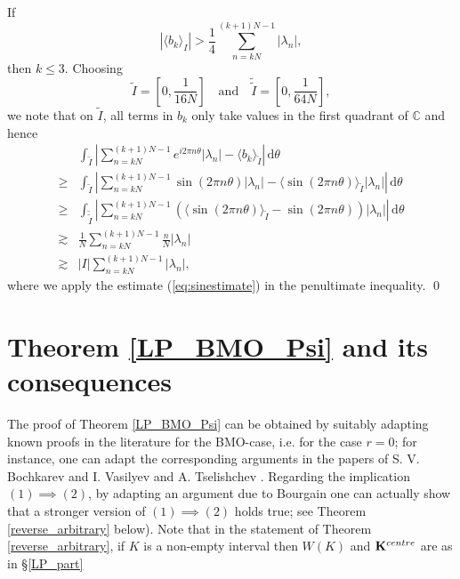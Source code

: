 \documentclass[a4paper, leqno, 10pt]{amsart}
\numberwithin{equation}{section}
\newcommand{\dd}{\mathrm{d}}
\newcommand{\C}{\mathbb{C}}
\newcommand{\dbtilde}[1]{\tilde{\tilde{#1}}}
\begin{document}
If \[
|\langle b_k \rangle_I| > \frac{1}{4} \sum_{n= k N}^{(k+1)N -1}   |\lambda_n|,\]
then $k \leq 3$. Choosing 
\[
\tilde I = 
\left[0, \frac{1}{16 N} \right] \quad \text{and} \quad \dbtilde{I} = \left[0, \frac{1}{64 N} \right],
\]
we note that on $\tilde I$, all terms in $b_k$ 
only take values in the first quadrant of $\C$ and hence
\begin{align*}  %
& \int_{\tilde I} \left|\sum_{n= k N}^{(k+1)N -1}  e^{i 2 \pi n \theta} |\lambda_n|  -  \langle b_k \rangle_{\tilde I} \right| \,  \dd \theta  \\ \geq
&  \int_{\tilde I} \left|\sum_{n= k N}^{(k+1)N -1}  \sin(2 \pi n \theta) |\lambda_n|  -  \langle \sin(2 \pi n \theta) \rangle_{\tilde I} |\lambda_n| \right| \, \dd \theta  \\ \geq
&  \int_{\dbtilde I} \left|\sum_{n= k N}^{(k+1)N -1} \left( \langle   \sin(2 \pi n \theta) \rangle_{\tilde I} - \sin(2 \pi n \theta)\right) |\lambda_n| \right| \, \dd \theta  \\ \gtrsim
&  \frac{1}{N}   \sum_{n= k N}^{(k+1)N -1} \frac{n}{N}  |\lambda_n|  \\ \gtrsim
&  |I|  \sum_{n= k N}^{(k+1)N -1}  |\lambda_n|,
\end{align*}
where we apply the estimate (\ref{eq:sinestimate}) in the penultimate inequality.
\qed
%

\section{Theorem \ref{LP_BMO_Psi} and its consequences}\label{BMOsection}  
The proof of Theorem \ref{LP_BMO_Psi} can be obtained by suitably adapting known proofs in the literature for the BMO-case, i.e. for the case $r=0$;  for instance,  one can adapt the corresponding arguments in the papers of S. V. Bochkarev \cite{B} and I. Vasilyev and A. Tselishchev \cite{V-T}. Regarding the implication $(1) \implies (2)$, by adapting an argument due to Bourgain \cite{B_SF} one can actually show that a stronger version of $(1) \implies (2)$ holds true; see Theorem \ref{reverse_arbitrary} below). Note that in the statement of Theorem \ref{reverse_arbitrary}, if $K$ is a non-empty interval then $W(K)$ and $\mathbf{K}^{\rm centre}$ are as in \S \ref{LP_part}
%
\end{document}
